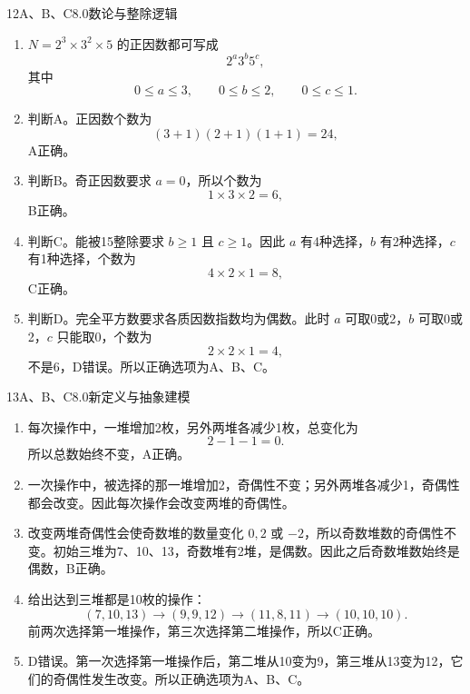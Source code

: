\begin{solution}{12}{A、B、C}{8.0}{数论与整除逻辑}
\begin{enumerate}[label=\textbf{Step \arabic*:},leftmargin=*]
  \item \(N=2^3\times3^2\times5\) 的正因数都可写成
  \[
    2^a3^b5^c,
  \]
  其中
  \[
    0\le a\le3,\qquad0\le b\le2,\qquad0\le c\le1.
  \]
  \item 判断A。正因数个数为
  \[
    (3+1)(2+1)(1+1)=24,
  \]
  A正确。
  \item 判断B。奇正因数要求 \(a=0\)，所以个数为
  \[
    1\times3\times2=6,
  \]
  B正确。
  \item 判断C。能被15整除要求 \(b\ge1\) 且 \(c\ge1\)。因此 \(a\) 有4种选择，\(b\) 有2种选择，\(c\) 有1种选择，个数为
  \[
    4\times2\times1=8,
  \]
  C正确。
  \item 判断D。完全平方数要求各质因数指数均为偶数。此时 \(a\) 可取0或2，\(b\) 可取0或2，\(c\) 只能取0，个数为
  \[
    2\times2\times1=4,
  \]
  不是6，D错误。所以正确选项为A、B、C。
\end{enumerate}
\end{solution}

\begin{solution}{13}{A、B、C}{8.0}{新定义与抽象建模}
\begin{enumerate}[label=\textbf{Step \arabic*:},leftmargin=*]
  \item 每次操作中，一堆增加2枚，另外两堆各减少1枚，总变化为
  \[
    2-1-1=0.
  \]
  所以总数始终不变，A正确。
  \item 一次操作中，被选择的那一堆增加2，奇偶性不变；另外两堆各减少1，奇偶性都会改变。因此每次操作会改变两堆的奇偶性。
  \item 改变两堆奇偶性会使奇数堆的数量变化 \(0,2\) 或 \(-2\)，所以奇数堆数的奇偶性不变。初始三堆为7、10、13，奇数堆有2堆，是偶数。因此之后奇数堆数始终是偶数，B正确。
  \item 给出达到三堆都是10枚的操作：
  \[
    (7,10,13)\longrightarrow(9,9,12)
    \longrightarrow(11,8,11)
    \longrightarrow(10,10,10).
  \]
  前两次选择第一堆操作，第三次选择第二堆操作，所以C正确。
  \item D错误。第一次选择第一堆操作后，第二堆从10变为9，第三堆从13变为12，它们的奇偶性发生改变。所以正确选项为A、B、C。
\end{enumerate}
\end{solution}

